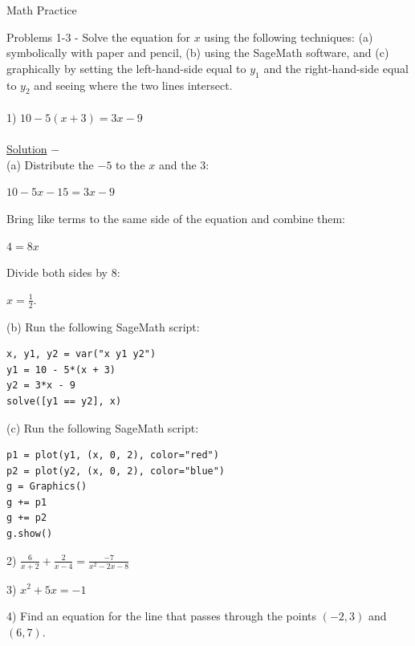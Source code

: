 \documentclass[12pt]{article}
\begin{document}
{\centering
\large Math Practice \par
}
\hfill \break

Problems 1-3 - Solve the equation for $x$ using the following techniques:
(a) symbolically with paper and pencil,
(b) using the SageMath software, and
(c) graphically by setting the left-hand-side equal to $y_1$ and the right-hand-side equal to $y_2$ and seeing where the two lines intersect. \\ \\
1) $10 - 5(x+3) = 3x - 9$ \\ \\
\underline{Solution} $-$ \\
(a) Distribute the $-5$ to the $x$ and the $3$:
\begin{center}
$10 - 5x - 15 = 3x - 9$
\end{center}
Bring like terms to the same side of the equation and combine them:
\begin{center}
$4 = 8x$
\end{center}
Divide both sides by $8$:
\begin{center}
$x = \frac{1}{2}.$
\end{center}
(b) Run the following SageMath script:
\begin{verbatim}
x, y1, y2 = var("x y1 y2")
y1 = 10 - 5*(x + 3)
y2 = 3*x - 9
solve([y1 == y2], x)
\end{verbatim}
(c) Run the following SageMath script:
\begin{verbatim}
p1 = plot(y1, (x, 0, 2), color="red")
p2 = plot(y2, (x, 0, 2), color="blue")
g = Graphics()
g += p1
g += p2
g.show()
\end{verbatim}

\pagebreak

2) $\frac{6}{x+2} + \frac{2}{x-4} = \frac{-7}{x^2 - 2x - 8}$

\pagebreak

3) $x^2 + 5x = -1$

\pagebreak

4) Find an equation for the line that passes through the points $(-2, 3)$ and $(6, 7)$.

\pagebreak
\end{document}
